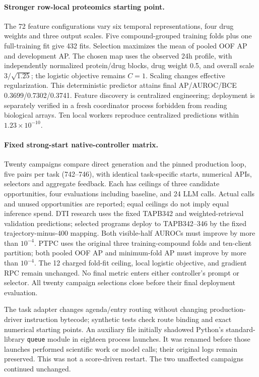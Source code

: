 \paragraph{Stronger row-local proteomics starting point.}
The 72 feature configurations vary six temporal representations, four drug weights and three output scales. Five compound-grouped training folds plus one full-training fit give 432 fits. Selection maximizes the mean of pooled OOF AP and development AP. The chosen map uses the observed 24h profile, with independently normalized protein/drug blocks, drug weight 0.5, and overall scale $3/\sqrt{1.25}$; the logistic objective remains $C=1$. Scaling changes effective regularization. This deterministic predictor attains final AP/AUROC/BCE 0.3699/0.7302/0.3741. Feature discovery is centralized engineering; deployment is separately verified in a fresh coordinator process forbidden from reading biological arrays. Ten local workers reproduce centralized predictions within $1.23\times10^{-10}$.

\paragraph{Fixed strong-start native-controller matrix.}
Twenty campaigns compare direct generation and the pinned production loop, five pairs per task (742--746), with identical task-specific starts, numerical APIs, selectors and aggregate feedback. Each has ceilings of three candidate opportunities, four evaluations including baseline, and 24 LLM calls. Actual calls and unused opportunities are reported; equal ceilings do not imply equal inference spend. DTI research uses the fixed TAPB342 and weighted-retrieval validation predictions; selected programs deploy to TAPB342--346 by the fixed trajectory-minus-400 mapping. Both visible-half AUROCs must improve by more than $10^{-4}$. PTPC uses the original three training-compound folds and ten-client partition; both pooled OOF AP and minimum-fold AP must improve by more than $10^{-4}$. The 12 charged fold-fit ceiling, local logistic objective, and gradient RPC remain unchanged. No final metric enters either controller's prompt or selector. All twenty campaign selections close before their final deployment evaluation.

The task adapter changes agenda/entry routing without changing production-driver instruction bytecode; synthetic tests check route binding and exact numerical starting points. An auxiliary file initially shadowed Python's standard-library \texttt{queue} module in eighteen process launches. It was renamed before those launches performed scientific work or model calls; their original logs remain preserved. This was not a score-driven restart. The two unaffected campaigns continued unchanged.


